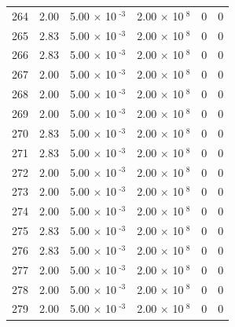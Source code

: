 \documentclass[a4paper,11pt]{article}
\begin{document}
\begin{center}
\begin{longtable}{|R{1.5cm}|R{2.4cm}|R{2.4cm}|R{2.4cm}|R{2.4cm}|R{2.4cm}|}
  264 &   2.00  &         5.00 $\times$ 10$^{\text{          -3}}$  &         2.00 $\times$ 10$^{\text{           8}}$  & 0  & 0 \\
  265 &   2.83  &         5.00 $\times$ 10$^{\text{          -3}}$  &         2.00 $\times$ 10$^{\text{           8}}$  & 0  & 0 \\
  266 &   2.83  &         5.00 $\times$ 10$^{\text{          -3}}$  &         2.00 $\times$ 10$^{\text{           8}}$  & 0  & 0 \\
  267 &   2.00  &         5.00 $\times$ 10$^{\text{          -3}}$  &         2.00 $\times$ 10$^{\text{           8}}$  & 0  & 0 \\
  268 &   2.00  &         5.00 $\times$ 10$^{\text{          -3}}$  &         2.00 $\times$ 10$^{\text{           8}}$  & 0  & 0 \\
  269 &   2.00  &         5.00 $\times$ 10$^{\text{          -3}}$  &         2.00 $\times$ 10$^{\text{           8}}$  & 0  & 0 \\
  270 &   2.83  &         5.00 $\times$ 10$^{\text{          -3}}$  &         2.00 $\times$ 10$^{\text{           8}}$  & 0  & 0 \\
  271 &   2.83  &         5.00 $\times$ 10$^{\text{          -3}}$  &         2.00 $\times$ 10$^{\text{           8}}$  & 0  & 0 \\
  272 &   2.00  &         5.00 $\times$ 10$^{\text{          -3}}$  &         2.00 $\times$ 10$^{\text{           8}}$  & 0  & 0 \\
  273 &   2.00  &         5.00 $\times$ 10$^{\text{          -3}}$  &         2.00 $\times$ 10$^{\text{           8}}$  & 0  & 0 \\
  274 &   2.00  &         5.00 $\times$ 10$^{\text{          -3}}$  &         2.00 $\times$ 10$^{\text{           8}}$  & 0  & 0 \\
  275 &   2.83  &         5.00 $\times$ 10$^{\text{          -3}}$  &         2.00 $\times$ 10$^{\text{           8}}$  & 0  & 0 \\
  276 &   2.83  &         5.00 $\times$ 10$^{\text{          -3}}$  &         2.00 $\times$ 10$^{\text{           8}}$  & 0  & 0 \\
  277 &   2.00  &         5.00 $\times$ 10$^{\text{          -3}}$  &         2.00 $\times$ 10$^{\text{           8}}$  & 0  & 0 \\
  278 &   2.00  &         5.00 $\times$ 10$^{\text{          -3}}$  &         2.00 $\times$ 10$^{\text{           8}}$  & 0  & 0 \\
  279 &   2.00  &         5.00 $\times$ 10$^{\text{          -3}}$  &         2.00 $\times$ 10$^{\text{           8}}$  & 0  & 0 \\

\end{longtable}
\end{center}
\end{document}
